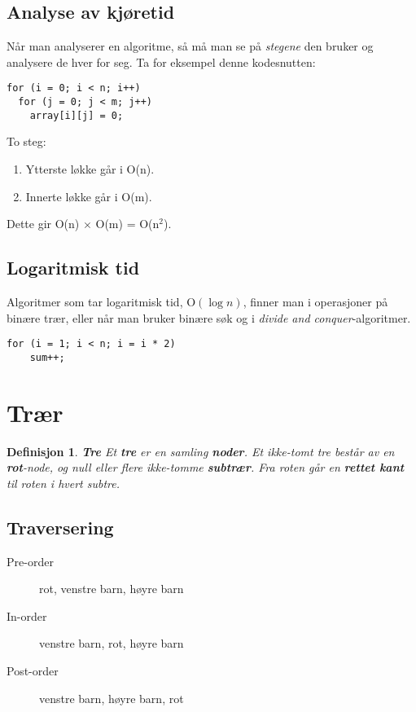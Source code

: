 \documentclass[11pt,a4paper]{article}
\theoremstyle{def}
\newtheorem{definition}[subsection]{Definisjon}
\begin{document}
\subsection{Analyse av kjøretid}
Når man analyserer en algoritme, så må man se på \textit{stegene} den bruker og analysere de hver for seg. Ta for eksempel denne kodesnutten:
\begin{lstlisting}
for (i = 0; i < n; i++)
  for (j = 0; j < m; j++)
    array[i][j] = 0;
\end{lstlisting}
\vspace{-20pt}

\noindent To steg:\vspace{-15pt}
\begin{enumerate}
\item
Ytterste løkke går i O(n).
\item
Innerte løkke går i O(m).
\end{enumerate}
\vspace{-15pt}
Dette gir O(n) $\times$ O(m) = O(n$^2$).

\subsection{Logaritmisk tid}
Algoritmer som tar logaritmisk tid, O$(\log n)$, finner man i operasjoner på binære trær, eller når man bruker binære søk og i \textit{divide and conquer}-algoritmer. 

\begin{lstlisting}
for (i = 1; i < n; i = i * 2)
    sum++;
\end{lstlisting}
\vspace{-15pt}

\newpage

\section{Trær}

\begin{definition}
\emph{\textbf{Tre}}
Et \textbf{tre} er en samling \textbf{noder}. Et ikke-tomt tre består av en \textbf{rot}-node, og null eller flere ikke-tomme \textbf{subtrær}. Fra roten går en \textbf{rettet kant} til roten i hvert subtre.
\end{definition}

\subsection{Traversering}
\begin{description}
\item[Pre-order] rot, venstre barn, høyre barn
\item[In-order] venstre barn, rot, høyre barn
\item[Post-order] venstre barn, høyre barn, rot
\end{description}
\end{document}
